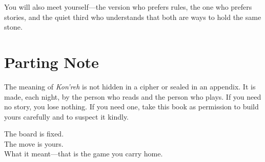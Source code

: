 \documentclass[11pt]{article}
\begin{document}
You will also meet yourself---the version who prefers rules, the one who prefers stories, and the quiet third who understands that both are ways to hold the same stone.

\section*{Parting Note}
The meaning of \emph{Kon'reh} is not hidden in a cipher or sealed in an appendix. It is made, each night, by the person who reads and the person who plays. If you need no story, you lose nothing. If you need one, take this book as permission to build yours carefully and to suspect it kindly.

The board is fixed.\\
The move is yours.\\
What it meant---that is the game you carry home.
\end{document}
